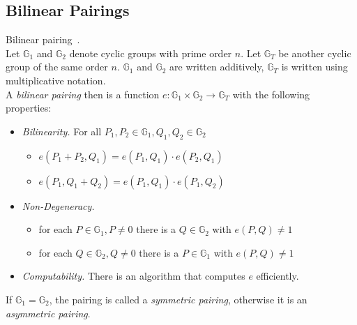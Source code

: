 

\subsection{Bilinear Pairings}\label{sec:bilinear-pairings}

\begin{definition}Bilinear pairing~\cite{kiraz_still_2016}.\\
    Let $\mathbb{G}_1$ and $\mathbb{G}_2$ denote cyclic groups with prime order $n$.
Let $\mathbb{G}_T$ be another cyclic group of the same order $n$. 
$\mathbb{G}_1$ and $\mathbb{G}_2$ are written additively, $\mathbb{G}_T$ is written using multiplicative notation.\\
    A \emph{bilinear pairing} then is a function $e: \mathbb{G}_1 \times \mathbb{G}_2 \rightarrow \mathbb{G}_T$ with the following properties:
    \begin{itemize}
        \item \emph{Bilinearity.} For all $P_1, P_2 \in \mathbb{G}_1, Q_1, Q_2 \in \mathbb{G}_2$
        \begin{itemize}
            \item $e(P_1+P_2, Q_1) = e(P_1,Q_1)\cdot e(P_2,Q_1)$
            \item $e(P_1, Q_1+Q_2)=e(P_1,Q_1)\cdot e(P_1,Q_2)$
        \end{itemize}
        \item \emph{Non-Degeneracy.}
        \begin{itemize}
            \item for each $P \in \mathbb{G}_1, P \neq 0$ there is a $Q \in \mathbb{G}_2$ with $e(P, Q) \neq 1$
            \item for each $Q \in \mathbb{G}_2, Q \neq 0$ there is a $P \in \mathbb{G}_1$ with $e(P, Q) \neq 1$
        \end{itemize}
        \item \emph{Computability.} There is an algorithm that computes $e$ efficiently.
    \end{itemize}
    If $\mathbb{G}_1 = \mathbb{G}_2$, the pairing is called a \emph{symmetric pairing}, otherwise it is an \emph{asymmetric pairing}.
\end{definition}

